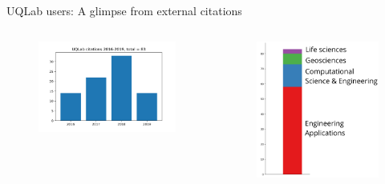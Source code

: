 \documentclass[]{rsuqbeamernew}
\begin{document}
\begin{frame}[t]{UQLab users: A glimpse from external citations}

\begin{columns}
  \begin{minipage}[c][0.30\textheight][c]{\linewidth}
    \begin{figure}
      \centering
      \includegraphics[width=0.8\linewidth]{../figures/cit_stat}
    \end{figure}
  \end{minipage}
  \begin{minipage}[c][0.6\textheight][c]{\linewidth}
    \begin{figure}
      \centering
      \includegraphics[width=0.75\linewidth]{../figures/uqlab_citations}
    \end{figure}
  \end{minipage}


\end{columns}
\end{frame}
\end{document}

